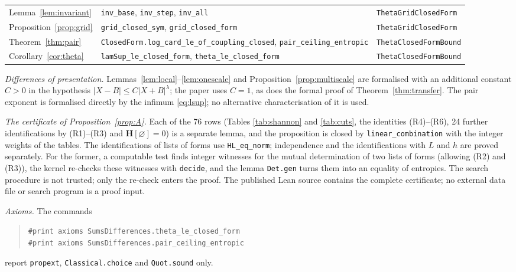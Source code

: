 \documentclass[11pt]{amsart}
\theoremstyle{definition}
\theoremstyle{remark}
\numberwithin{equation}{section}
\newcommand{\Hb}{\mathbf{H}}
\newcommand{\lean}[1]{\texttt{#1}}
\begin{document}
{\begin{longtable}{@{}>{\raggedright\arraybackslash}p{2.6cm}>{\raggedright\arraybackslash}p{7.5cm}>{\raggedright\arraybackslash}p{4.6cm}@{}}
Lemma~\ref{lem:invariant} & \lean{inv\_\allowbreak{}base}, \lean{inv\_\allowbreak{}step}, \lean{inv\_\allowbreak{}all} & \lean{ThetaGridClosedForm}\\
Proposition~\ref{prop:grid} & \lean{grid\_\allowbreak{}closed\_\allowbreak{}sym}, \lean{grid\_\allowbreak{}closed\_\allowbreak{}form} & \lean{ThetaGridClosedForm}\\
Theorem~\ref{thm:pair} & \lean{ClosedForm.log\_\allowbreak{}card\_\allowbreak{}le\_\allowbreak{}of\_\allowbreak{}coupling\_\allowbreak{}closed}, \lean{pair\_\allowbreak{}ceiling\_\allowbreak{}entropic} & \lean{ThetaClosedFormBound}\\
Corollary~\ref{cor:theta} & \lean{lamSup\_\allowbreak{}le\_\allowbreak{}closed\_\allowbreak{}form}, \lean{theta\_\allowbreak{}le\_\allowbreak{}closed\_\allowbreak{}form} & \lean{ThetaClosedFormBound}\\
\bottomrule
\end{longtable}}

\medskip
\noindent\emph{Differences of presentation.} Lemmas~\ref{lem:local}--\ref{lem:onescale} and
Proposition~\ref{prop:multiscale} are formalised with an additional constant $C>0$ in the
hypothesis $|X-B|\le C|X+B|^\lambda$; the paper uses $C=1$, as does the formal proof of
Theorem~\ref{thm:transfer}. The pair exponent is formalised directly by the infimum
\eqref{eq:lsup}; no alternative characterisation of it is used.

\medskip
\noindent\emph{The certificate of Proposition~\ref{prop:A}.} Each of the 76 rows (Tables
\ref{tab:shannon} and \ref{tab:cuts}, the identities (R4)--(R6), 24 further identifications by (R1)--(R3) and
$\Hb[\varnothing]=0$) is a separate lemma, and the proposition is closed by
\lean{linear\_\allowbreak{}combination} with the integer weights of the tables.
The identifications of lists of forms use \lean{HL\_\allowbreak{}eq\_\allowbreak{}norm}; independence and the
identifications with $L$ and $h$ are proved separately. For the former,
a computable test finds integer witnesses for
the mutual determination of two lists of forms (allowing (R2) and (R3)), the kernel re-checks
these witnesses with \lean{decide}, and the lemma \lean{Det.gen} turns them into an equality of
entropies. The search procedure is not trusted; only the re-check enters the proof. The published Lean source contains the complete certificate;
no external data file or search program is a proof input.

\medskip
\noindent\emph{Axioms.} The commands
\begin{quote}\small
\lean{\#print axioms SumsDifferences.theta\_le\_closed\_form}\\
\lean{\#print axioms SumsDifferences.pair\_ceiling\_entropic}
\end{quote}
report \lean{propext}, \lean{Classical.choice} and \lean{Quot.sound} only.
\end{document}
